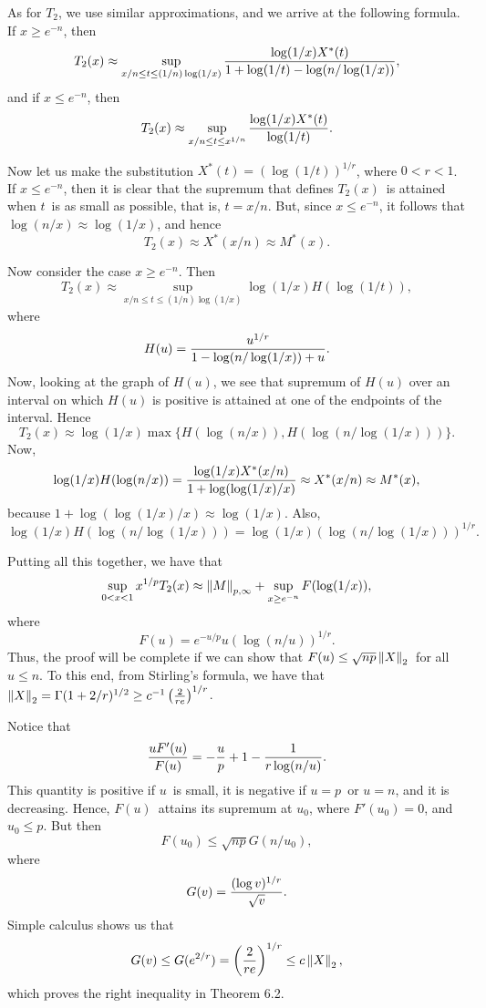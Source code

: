As for $T_2$, we use similar approximations, and we arrive at the following
formula. If $x \ge e^{-n}$, then $$ T_2(x) \approx \sup_{x/n \le t \le
(1/n) \log(1/x)}
{ \log(1/x) X^*(t) \over 1 + \log(1/t) - \log(n/\log(1/x)) } ,$$ and if $x
\le e^{-n}$, then
$$ T_2(x) \approx \sup_{x/n \le t \le x^{1/n}} { \log(1/x) X^*(t) \over
\log(1/t) } .$$

Now let us make the substitution $X^*(t) = (\log(1/t))^{1/r}$, where
$0<r<1$. If $x \le e^{-n}$, then it is clear that the supremum that defines
$T_2(x)$\ is attained when $t$\ is as small as possible, that is, $t =
x/n$. But, since $x \le e^{-n}$, it follows that $\log(n/x) \approx
\log(1/x)$, and hence
$$ T_2(x) \approx X^*(x/n) \approx M^*(x) .$$

Now consider the case $x \ge e^{-n}$. Then $$ T_2(x) \approx \sup_{x/n \le
t \le (1/n) \log(1/x)} \log(1/x) H(\log(1/t)) ,$$ where
$$ H(u) = {u^{1/r} \over 1 - \log(n/\log(1/x)) + u} .$$ Now, looking at the
graph of $H(u)$, we see that supremum of $H(u)$ over an interval on which
$H(u)$ is positive is attained at one of the endpoints of the interval.
Hence $$ T_2(x) \approx \log(1/x) \max\{ H(\log(n/x)) ,
H(\log(n/\log(1/x))) \} .$$ Now, $$ \log(1/x) H(\log(n/x)) = {\log(1/x)
X^*(x/n) \over 1+\log(\log(1/x)/x)} \approx X^*(x/n) \approx M^*(x) ,$$
because $1+\log(\log(1/x)/x) \approx \log(1/x)$. Also, $$ \log(1/x)
H(\log(n/\log(1/x))) = \log(1/x) (\log(n/\log(1/x)))^{1/r} .$$

Putting all this together, we have that
$$ \sup_{0<x<1} x^{1/p} T_2(x) \approx \left\|M\right\|_{p,\infty} + \sup_{x \ge
e^{-n}} F(\log(1/x)) ,$$
where
$$ F(u) = e^{-u/p} u (\log(n/u))^{1/r} .$$ Thus, the proof will be complete
if we can show that $F(u) \le \sqrt{np} \left\|X\right\|_2$\ for all $u \le n$. To
this end,
from Stirling's formula,
we have that $\left\|X\right\|_2 = \Gamma(1+2/r)^{1/2} \ge c^{-1} \left({2\over r
e}\right)^{1/r} $.

Notice that
$$ {u F'(u) \over F(u)} = -{u\over p} + 1 - {1 \over r \log(n/u)} .$$ This
quantity is positive if $u$\ is small, it is negative if $u = p$\ or $u =
n$, and it is decreasing. Hence, $F(u)$\ attains its supremum at $u_0$,
where $F'(u_0) = 0$, and $u_0 \le p$. But then $$ F(u_0) \le \sqrt{np}
G(n/u_0) ,$$
where
$$ G(v) = {(\log v)^{1/r}\over \sqrt v} .$$ Simple calculus shows us that
$$ G(v) \le G(e^{2/r}) = \left({2\over r e}\right )^{1/r} \le c \left\|X\right\|_2
,$$
which proves the right inequality in Theorem 6.2.


\bs


